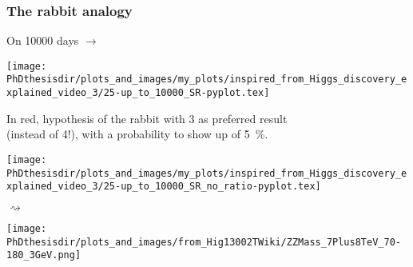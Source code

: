 \begin{frame}
\frametitle{The rabbit analogy}
\addtocounter{framenumber}{-1}
\transdissolve
{}
\begin{center}
\begin{minipage}[c]{.29\textwidth}
On \num{10000} days $\rightarrow$
\end{minipage}
\begin{minipage}[c]{.4\textwidth}
\vspace{-\baselineskip}
\texttt{[image: \\PhDthesisdir/plots\_and\_images/my\_plots/inspired\_from\_Higgs\_discovery\_explained\_video\_3/25-up\_to\_10000\_SR-pyplot.tex]}
\end{minipage}
\begin{minipage}[c]{.29\textwidth}
In red, hypothesis of the rabbit with 3 as preferred result\\
(instead of 4!), with a probability to show up of \SI{5}{\%}.
\end{minipage}
\end{center}
\end{frame}

\begin{frame}
\transdissolve
{}
\begin{center}
\begin{minipage}[c]{.4\textwidth}
\texttt{[image: \\PhDthesisdir/plots\_and\_images/my\_plots/inspired\_from\_Higgs\_discovery\_explained\_video\_3/25-up\_to\_10000\_SR\_no\_ratio-pyplot.tex]}
\end{minipage}
\begin{minipage}[c]{.1\textwidth}
\begin{center}
\huge$\rightsquigarrow$
\end{center}
\end{minipage}
\begin{minipage}[c]{.4\textwidth}
\texttt{[image: \\PhDthesisdir/plots\_and\_images/from\_Hig13002TWiki/ZZMass\_7Plus8TeV\_70-180\_3GeV.png]}
\end{minipage}
\end{center}
\end{frame}

